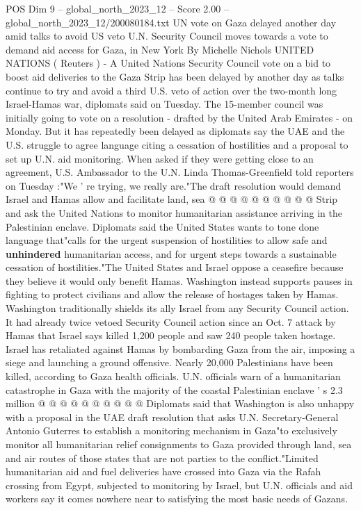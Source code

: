 \begin{textsample}{POS Dim 9 – global\_north\_2023\_12 – Score 2.00 – global\_north\_2023\_12/200080184.txt}  \label{ex:f9_pos_164}
UN vote on Gaza delayed another day amid talks to avoid US veto U.N.
Security Council moves towards a vote to demand aid access for Gaza, in New York By Michelle Nichols UNITED NATIONS ( Reuters ) - A United Nations Security Council vote on a bid to boost aid deliveries to the Gaza Strip has been delayed by another day as talks continue to try and avoid a third U.S. veto of action over the two-month long Israel-Hamas war, diplomats said on Tuesday.
The 15-member council was initially going to vote on a resolution - drafted by the United Arab Emirates - on Monday.
But it has repeatedly been delayed as diplomats say the UAE and the U.S. struggle to agree language citing a cessation of hostilities and a proposal to set up U.N. aid monitoring.
When asked if they were getting close to an agreement, U.S.
Ambassador to the U.N.
Linda Thomas-Greenfield told reporters on Tuesday :"We ' re trying, we really are."The draft resolution would demand Israel and Hamas allow and facilitate land, sea @ @ @ @ @ @ @ @ @ @ Strip and ask the United Nations to monitor humanitarian assistance arriving in the Palestinian enclave.
Diplomats said the United States wants to tone done language that"calls for the urgent suspension of hostilities to allow safe and \textbf{unhindered} humanitarian access, and for urgent steps towards a sustainable cessation of hostilities."The United States and Israel oppose a ceasefire because they believe it would only benefit Hamas.
Washington instead supports pauses in fighting to protect civilians and allow the release of hostages taken by Hamas.
Washington traditionally shields its ally Israel from any Security Council action.
It had already twice vetoed Security Council action since an Oct. 7 attack by Hamas that Israel says killed 1,200 people and saw 240 people taken hostage.
Israel has retaliated against Hamas by bombarding Gaza from the air, imposing a siege and launching a ground offensive.
Nearly 20,000 Palestinians have been killed, according to Gaza health officials.
U.N. officials warn of a humanitarian catastrophe in Gaza with the majority of the coastal Palestinian enclave ' s 2.3 million @ @ @ @ @ @ @ @ @ @ Diplomats said that Washington is also unhappy with a proposal in the UAE draft resolution that asks U.N.
Secretary-General Antonio Guterres to establish a monitoring mechanism in Gaza"to exclusively monitor all humanitarian relief consignments to Gaza provided through land, sea and air routes of those states that are not parties to the conflict."Limited humanitarian aid and fuel deliveries have crossed into Gaza via the Rafah crossing from Egypt, subjected to monitoring by Israel, but U.N. officials and aid workers say it comes nowhere near to satisfying the most basic needs of Gazans.

\end{textsample}
